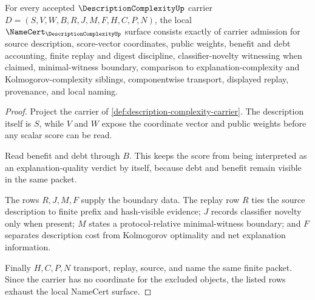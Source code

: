 \begin{theorem}
\label{thm:description-complexity-namecert-obligations}
For every accepted $\DescriptionComplexityUp$ carrier $D=(S,V,W,B,R,J,M,F,H,C,P,N)$, the local $\NameCert_{\DescriptionComplexityUp}$ surface consists exactly of carrier admission for source description, score-vector coordinates, public weights, benefit and debt accounting, finite replay and digest discipline, classifier-novelty witnessing when claimed, minimal-witness boundary, comparison to explanation-complexity and Kolmogorov-complexity siblings, componentwise transport, displayed replay, provenance, and local naming.
\end{theorem}
\begin{proof}
Project the carrier of \autoref{def:description-complexity-carrier}. The description itself is $S$, while $V$ and $W$ expose the coordinate vector and public weights before any scalar score can be read.

Read benefit and debt through $B$. This keeps the score from being interpreted as an explanation-quality verdict by itself, because debt and benefit remain visible in the same packet.

The rows $R,J,M,F$ supply the boundary data. The replay row $R$ ties the source description to finite prefix and hash-visible evidence; $J$ records classifier novelty only when present; $M$ states a protocol-relative minimal-witness boundary; and $F$ separates description cost from Kolmogorov optimality and net explanation information.

Finally $H,C,P,N$ transport, replay, source, and name the same finite packet. Since the carrier has no coordinate for the excluded objects, the listed rows exhaust the local NameCert surface.
\end{proof}

